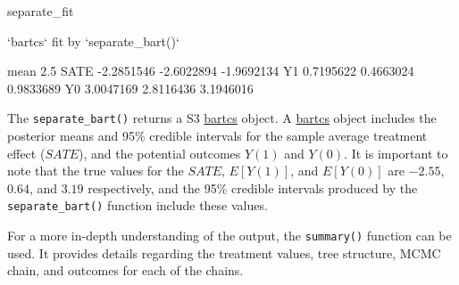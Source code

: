 \begin{example}
separate_fit

`bartcs` fit by `separate_bart()`

           mean       2.5%
SATE -2.2851546 -2.6022894 -1.9692134
Y1    0.7195622  0.4663024  0.9833689
Y0    3.0047169  2.8116436  3.1946016
\end{example}
The \verb|separate_bart()| returns a S3 \href{https://CRAN.R-project.org/package=bartcs}{bartcs} object. A \href{https://CRAN.R-project.org/package=bartcs}{bartcs} object includes the posterior means and 95\% credible intervals for the sample average treatment effect ($SATE$), and the potential outcomes $Y(1)$ and $Y(0)$. It is important to note that the true values for the $SATE$, $E[Y(1)]$, and $E[Y(0)]$ are $-2.55$, $0.64$, and $3.19$ respectively, and the 95\% credible intervals produced by the \verb|separate_bart()| function include these values.

For a more in-depth understanding of the output, the \verb|summary()| function can be used.  It provides details regarding the treatment values, tree structure, MCMC chain, and outcomes for each of the chains.

